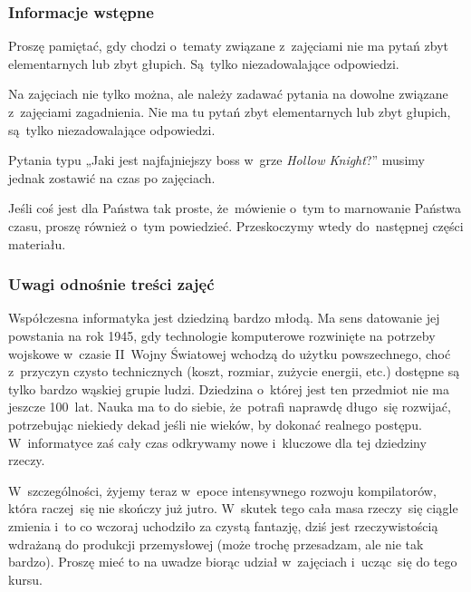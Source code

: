 \documentclass[10pt,t]{beamer}
\begin{document}
\begin{frame}
  \frametitle{Informacje wstępne}


  Proszę pamiętać, gdy chodzi o~tematy związane z~zajęciami
  \alert{nie} ma pytań zbyt elementarnych lub zbyt głupich. Są~tylko
  niezadowalające odpowiedzi.

  Na zajęciach nie tylko można, ale \alert{należy} zadawać pytania
  na dowolne związane z~zajęciami zagadnienia. Nie ma tu pytań zbyt
  elementarnych lub zbyt głupich, są~tylko niezadowalające odpowiedzi.

  Pytania typu „Jaki jest najfajniejszy boss w~grze \textit{Hollow
    Knight}?” musimy jednak zostawić na czas po zajęciach.

  Jeśli coś jest dla Państwa tak proste, że~mówienie o~tym to marnowanie
  Państwa czasu, proszę również o~tym powiedzieć. Przeskoczymy wtedy
  do~następnej części materiału.

\end{frame}





\begin{frame}
  \frametitle{Uwagi odnośnie treści zajęć}


  Współczesna informatyka jest dziedziną bardzo młodą. Ma sens datowanie
  jej powstania na rok 1945, gdy technologie komputerowe rozwinięte na
  potrzeby wojskowe w~czasie II~Wojny Światowej wchodzą do użytku
  powszechnego, choć z~przyczyn czysto technicznych (koszt, rozmiar,
  zużycie energii, etc.) dostępne są tylko bardzo wąskiej
  grupie ludzi. Dziedzina o~której jest ten przedmiot nie ma jeszcze
  100~lat. Nauka ma to do siebie, że~potrafi naprawdę długo~się rozwijać,
  potrzebując niekiedy dekad jeśli nie wieków, by dokonać realnego postępu.
  W~informatyce zaś cały czas odkrywamy nowe i~kluczowe dla tej dziedziny
  rzeczy.

  W~szczególności, żyjemy teraz w~epoce intensywnego rozwoju kompilatorów,
  która raczej~się nie skończy już jutro. W~skutek tego cała masa rzeczy~się
  ciągle zmienia i~to co wczoraj uchodziło za czystą fantazję, dziś jest
  rzeczywistością wdrażaną do produkcji przemysłowej (może trochę
  przesadzam, ale nie tak bardzo). Proszę mieć to na uwadze biorąc udział
  w~zajęciach i~ucząc~się do tego kursu.

\end{frame}
\end{document}
